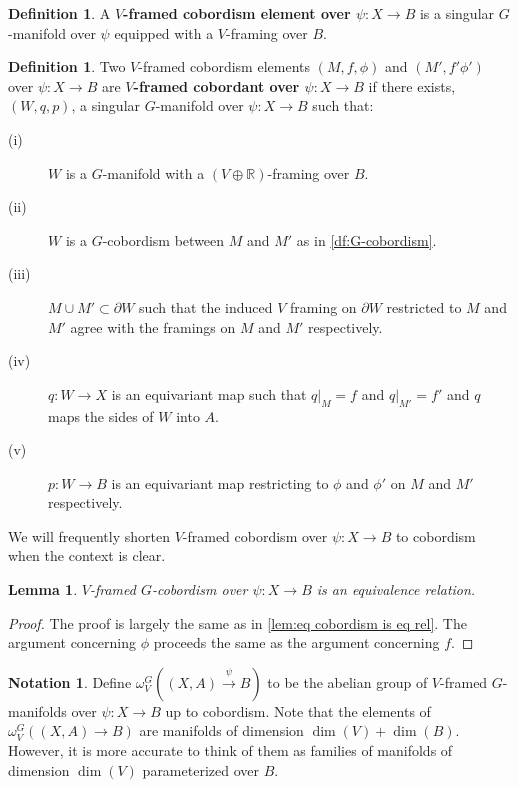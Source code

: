 \documentclass[11pt]{amsart}
\newcommand{\R}{\mathbb R}
\theoremstyle{plain}   %
\newtheorem{lem}[thm]{Lemma}
\theoremstyle{definition}
\newtheorem{df}[thm]{Definition}
\newtheorem{notn}[thm]{Notation}
\theoremstyle{remark}
\numberwithin{equation}{section}
\begin{document}
\begin{df}
A \textbf{$V$-framed cobordism element over $\psi:X\to B$} is a singular $G$-manifold over $\psi$ equipped with a $V$-framing over $B$. 
\end{df}

\begin{df}
Two $V$-framed cobordism elements $(M,f,\phi)$ and $(M',f'\phi')$ over $\psi:X\to B$ are \textbf{$V$-framed cobordant over $\psi:X\to B$} if there exists, $(W,q,p)$, a singular $G$-manifold over $\psi:X\to B$ such that:
\begin{description}
\item[(i)] $W$ is a $G$-manifold with a $(V\oplus \R)$-framing over $B$.
\item[(ii)] $W$ is a $G$-cobordism between $M$ and $M'$ as in \cref{df:G-cobordism}. 
\item[(iii)] $M\cup M'\subset \partial W$ such that the induced $V$ framing on $\partial W$ restricted to $M$ and $M'$ agree with the framings on $M$ and $M'$ respectively.
\item[(iv)] $q:W\to X$ is an equivariant map such that $q|_{M}=f$ and $q|_{M'}=f'$ and $q$ maps the sides of $W$ into $A$. 
\item[(v)] $p:W\to B$ is an equivariant map restricting to $\phi$ and $\phi'$ on $M$ and $M'$ respectively.  
\end{description}
We will frequently shorten $V$-framed cobordism over $\psi:X\to B$ to cobordism when the context is clear.
\end{df}

\begin{lem}
$V$-framed $G$-cobordism over $\psi:X\to B$ is an equivalence relation. 
\end{lem}

\begin{proof}
The proof is largely the same as in \cref{lem:eq cobordism is eq rel}. The argument concerning $\phi$ proceeds the same as the argument concerning $f$.  
\end{proof}

\begin{notn}
Define $\omega_{V}^G((X,A)\xrightarrow{\psi} B)$ to be the abelian group of $V$-framed $G$-manifolds over $\psi:X\to B$ up to cobordism. Note that the elements of $\omega_{V}^G((X,A)\to B)$ are manifolds of dimension $\dim(V)+\dim(B)$. However, it is more accurate to think of them as families of manifolds of dimension $\dim(V)$ parameterized over $B$.
\end{notn}
\end{document}
